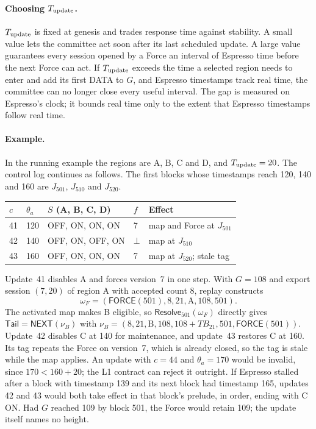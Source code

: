 \documentclass[11pt,a4paper]{article}
\newcommand{\TB}{\mathit{TB}}
\newcommand{\tagg}[1]{\ensuremath{\mathsf{#1}}}
\begin{document}
\paragraph{Choosing $T_{\rm update}$.}
$T_{\rm update}$ is fixed at genesis and trades response time against
stability. A small value lets the committee act soon after its last
scheduled update. A large value guarantees every session opened by a
Force an interval of Espresso time before the next Force can act. If
$T_{\rm update}$ exceeds the time a selected region needs to enter and
add its first DATA to $G$, and Espresso timestamps track real time, the
committee can no longer close every useful interval. The gap is measured
on Espresso's clock; it bounds real time only to the extent that
Espresso timestamps follow real time.

\paragraph{Example.}
In the running example the regions are A, B, C and D, and
$T_{\rm update}=20$. The control log continues as follows. The first
blocks whose timestamps reach 120, 140 and 160 are $J_{501}$, $J_{510}$
and $J_{520}$.
\begin{center}\small
\begin{tabular}{@{}lllll@{}}\toprule
$c$ & $\theta_a$ & $S$ (A, B, C, D) & $f$ & Effect\\\midrule
41 & 120 & OFF, ON, ON, ON & 7 & map and Force at $J_{501}$\\
42 & 140 & OFF, ON, OFF, ON & $\bot$ & map at $J_{510}$\\
43 & 160 & OFF, ON, ON, ON & 7 & map at $J_{520}$; stale tag\\\bottomrule
\end{tabular}
\end{center}
Update~41 disables A and forces version~7 in one step. With $G=108$
and export session $(7,20)$ of region A with accepted count 8, replay
constructs
\[
 \omega_F=(\tagg{FORCE}(501),8,21,\text{A},108,501).
\]
The activated map makes B eligible, so
$\tagg{Resolve}_{501}(\omega_F)$ directly gives
$\mathsf{Tail}=\tagg{NEXT}(\nu_B)$ with
$\nu_B=(8,21,\text{B},108,108+\TB_{21},501,\tagg{FORCE}(501))$.
Update~42 disables C at 140 for maintenance, and
update~43 restores C at 160. Its tag repeats the Force on version~7,
which is already closed, so the tag is stale while the map applies. An
update with $c=44$ and $\theta_a=170$ would be invalid, since
$170<160+20$; the L1 contract can reject it outright. If Espresso stalled
after a block with timestamp 139 and its next block had timestamp 165,
updates 42 and 43 would both take effect in that block's prelude, in
order, ending with C ON. Had $G$ reached 109 by block 501, the Force
would retain 109; the update itself names no height.
\end{document}

